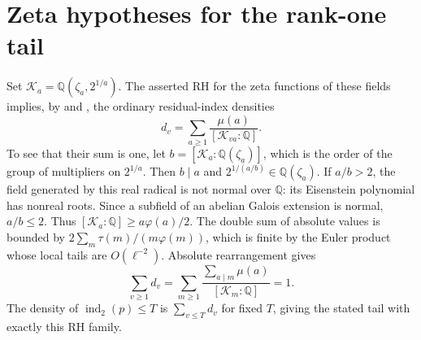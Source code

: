 \documentclass[11pt,reqno]{amsart}
\newcommand{\Q}{\mathbb Q}
\begin{document}
\section{Zeta hypotheses for the rank-one tail}\label{app:tail}
Set \(\mathcal K_a=\Q(\zeta_a,2^{1/a})\). The asserted RH for the zeta functions of these fields implies, by \cite[Theorem~2]{Moree} and \cite[Theorem~3.1 at modulus 1]{HKMS}, the ordinary residual-index densities
\[
 d_v=\sum_{a\ge1}\frac{\mu(a)}{[\mathcal K_{va}:\Q]}.
\]
To see that their sum is one, let \(b=[\mathcal K_a:\Q(\zeta_a)]\), which is the order of the group of multipliers on \(2^{1/a}\). Then \(b\mid a\) and \(2^{1/(a/b)}\in\Q(\zeta_a)\). If \(a/b>2\), the field generated by this real radical is not normal over \(\Q\): its Eisenstein polynomial has nonreal roots. Since a subfield of an abelian Galois extension is normal, \(a/b\le2\). Thus \([\mathcal K_a:\Q]\ge a\varphi(a)/2\). The double sum of absolute values is bounded by \(2\sum_m\tau(m)/(m\varphi(m))\), which is finite by the Euler product whose local tails are \(O(\ell^{-2})\). Absolute rearrangement gives
\[
 \sum_{v\ge1}d_v
   =\sum_{m\ge1}\frac{\sum_{a\mid m}\mu(a)}{[\mathcal K_m:\Q]}=1.
\]
The density of \(\operatorname{ind}_2(p)\le T\) is \(\sum_{v\le T}d_v\) for fixed \(T\), giving the stated tail with exactly this RH family.
\end{document}
